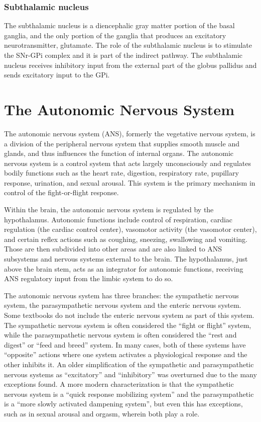 \documentclass[]{book}
\begin{document}
\hypertarget{subthalamic-nucleus}{%
\subsection{Subthalamic nucleus}\label{subthalamic-nucleus}}

The subthalamic nucleus is a diencephalic gray matter portion of the basal ganglia, and the only portion of the ganglia that produces an excitatory neurotransmitter, glutamate. The role of the subthalamic nucleus is to stimulate the SNr-GPi complex and it is part of the indirect pathway. The subthalamic nucleus receives inhibitory input from the external part of the globus pallidus and sends excitatory input to the GPi.

\hypertarget{the-autonomic-nervous-system}{%
\chapter{The Autonomic Nervous System}\label{the-autonomic-nervous-system}}

The autonomic nervous system (ANS), formerly the vegetative nervous system, is a division of the peripheral nervous system that supplies smooth muscle and glands, and thus influences the function of internal organs. The autonomic nervous system is a control system that acts largely unconsciously and regulates bodily functions such as the heart rate, digestion, respiratory rate, pupillary response, urination, and sexual arousal. This system is the primary mechanism in control of the fight-or-flight response.

Within the brain, the autonomic nervous system is regulated by the hypothalamus. Autonomic functions include control of respiration, cardiac regulation (the cardiac control center), vasomotor activity (the vasomotor center), and certain reflex actions such as coughing, sneezing, swallowing and vomiting. Those are then subdivided into other areas and are also linked to ANS subsystems and nervous systems external to the brain. The hypothalamus, just above the brain stem, acts as an integrator for autonomic functions, receiving ANS regulatory input from the limbic system to do so.

The autonomic nervous system has three branches: the sympathetic nervous system, the parasympathetic nervous system and the enteric nervous system. Some textbooks do not include the enteric nervous system as part of this system. The sympathetic nervous system is often considered the ``fight or flight'' system, while the parasympathetic nervous system is often considered the ``rest and digest'' or ``feed and breed'' system. In many cases, both of these systems have ``opposite'' actions where one system activates a physiological response and the other inhibits it. An older simplification of the sympathetic and parasympathetic nervous systems as ``excitatory'' and ``inhibitory'' was overturned due to the many exceptions found. A more modern characterization is that the sympathetic nervous system is a ``quick response mobilizing system'' and the parasympathetic is a ``more slowly activated dampening system'', but even this has exceptions, such as in sexual arousal and orgasm, wherein both play a role.
\end{document}
